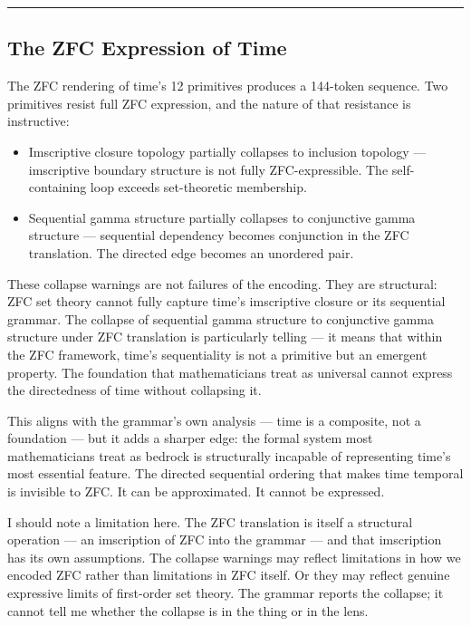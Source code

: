 \documentclass[12pt,a4paper]{article}
\begin{document}
\begin{center}
\rule{0.5\textwidth}{0.4pt}
\end{center}

\subsection{The ZFC Expression of Time}

The ZFC rendering of time's 12 primitives produces a 144-token sequence. Two primitives resist full ZFC expression, and the nature of that resistance is instructive:

\begin{itemize}
    \item Imscriptive closure topology partially collapses to inclusion topology --- imscriptive boundary structure is not fully ZFC-expressible. The self-containing loop exceeds set-theoretic membership.
    \item Sequential gamma structure partially collapses to conjunctive gamma structure --- sequential dependency becomes conjunction in the ZFC translation. The directed edge becomes an unordered pair.
\end{itemize}

These collapse warnings are not failures of the encoding. They are structural: ZFC set theory cannot fully capture time's imscriptive closure or its sequential grammar. The collapse of sequential gamma structure to conjunctive gamma structure under ZFC translation is particularly telling --- it means that within the ZFC framework, time's sequentiality is not a primitive but an emergent property. The foundation that mathematicians treat as universal cannot express the directedness of time without collapsing it.

This aligns with the grammar's own analysis --- time is a composite, not a foundation --- but it adds a sharper edge: the formal system most mathematicians treat as bedrock is structurally incapable of representing time's most essential feature. The directed sequential ordering that makes time temporal is invisible to ZFC. It can be approximated. It cannot be expressed.

I should note a limitation here. The ZFC translation is itself a structural operation --- an imscription of ZFC into the grammar --- and that imscription has its own assumptions. The collapse warnings may reflect limitations in how we encoded ZFC rather than limitations in ZFC itself. Or they may reflect genuine expressive limits of first-order set theory. The grammar reports the collapse; it cannot tell me whether the collapse is in the thing or in the lens.
\end{document}
